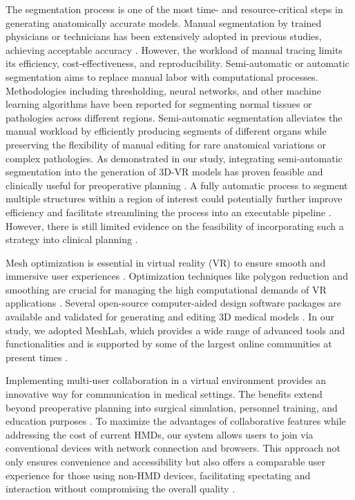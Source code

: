 \documentclass[sn-mathphys-num]{sn-jnl}%
\theoremstyle{thmstyleone}%
\theoremstyle{thmstyletwo}%
\theoremstyle{thmstylethree}%
\begin{document}
The segmentation process is one of the most time- and resource-critical steps in generating anatomically accurate models. Manual segmentation by trained physicians or technicians has been extensively adopted in previous studies, achieving acceptable accuracy \cite{RN17, RN48, RN49}. However, the workload of manual tracing limits its efficiency, cost-effectiveness, and reproducibility. Semi-automatic or automatic segmentation aims to replace manual labor with computational processes. Methodologies including thresholding, neural networks, and other machine learning algorithms have been reported for segmenting normal tissues \cite{RN50} or pathologies \cite{RN52, RN54, RN55} across different regions. Semi-automatic segmentation alleviates the manual workload by efficiently producing segments of different organs while preserving the flexibility of manual editing for rare anatomical variations or complex pathologies. As demonstrated in our study, integrating semi-automatic segmentation into the generation of 3D-VR models has proven feasible and clinically useful for preoperative planning \cite{RN10, RN23}. A fully automatic process to segment multiple structures within a region of interest could potentially further improve efficiency and facilitate streamlining the process into an executable pipeline \cite{RN51, RN57, RN56}. However, there is still limited evidence on the feasibility of incorporating such a strategy into clinical planning \cite{RN9}.

Mesh optimization is essential in virtual reality (VR) to ensure smooth and immersive user experiences \cite{RN58}. Optimization techniques like polygon reduction and smoothing are crucial for managing the high computational demands of VR applications \cite{RN58, RN59}. Several open-source computer-aided design software packages are available and validated for generating and editing 3D medical models \cite{RN60, RN5}. In our study, we adopted MeshLab, which provides a wide range of advanced tools and functionalities and is supported by some of the largest online communities at present times \cite{RN61}.

Implementing multi-user collaboration in a virtual environment provides an innovative way for communication in medical settings. The benefits extend beyond preoperative planning into surgical simulation, personnel training, and education purposes \cite{RN64, RN26, RN65}. To maximize the advantages of collaborative features while addressing the cost of current HMDs, our system allows users to join via conventional devices with network connection and browsers. This approach not only ensures convenience and accessibility but also offers a comparable user experience for those using non-HMD devices, facilitating spectating and interaction without compromising the overall quality \cite{RN63}.
\end{document}
